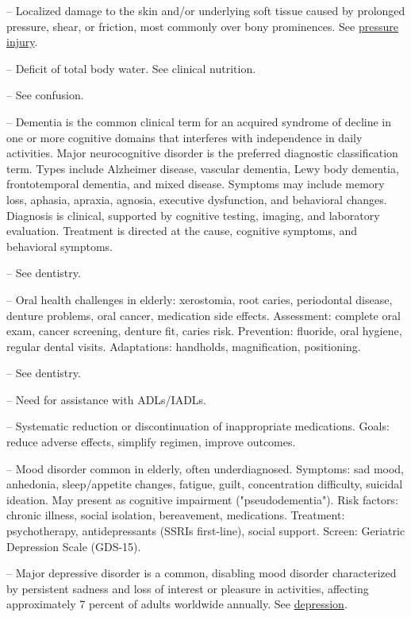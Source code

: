 -- Localized damage to the skin and/or underlying soft tissue caused by prolonged pressure, shear, or friction, most commonly over bony prominences. See \hyperlink{Pressure Injury}{pressure injury}.

-- Deficit of total body water. See clinical nutrition.

-- See confusion.

-- Dementia is the common clinical term for an acquired syndrome of decline in one or more cognitive domains that interferes with independence in daily activities. Major neurocognitive disorder is the preferred diagnostic classification term. Types include Alzheimer disease, vascular dementia, Lewy body dementia, frontotemporal dementia, and mixed disease. Symptoms may include memory loss, aphasia, apraxia, agnosia, executive dysfunction, and behavioral changes. Diagnosis is clinical, supported by cognitive testing, imaging, and laboratory evaluation. Treatment is directed at the cause, cognitive symptoms, and behavioral symptoms.

-- See dentistry.

-- Oral health challenges in elderly: xerostomia, root caries, periodontal disease, denture problems, oral cancer, medication side effects. Assessment: complete oral exam, cancer screening, denture fit, caries risk. Prevention: fluoride, oral hygiene, regular dental visits. Adaptations: handholds, magnification, positioning.

-- See dentistry.

-- Need for assistance with ADLs/IADLs.

-- Systematic reduction or discontinuation of inappropriate medications. Goals: reduce adverse effects, simplify regimen, improve outcomes.

-- Mood disorder common in elderly, often underdiagnosed. Symptoms: sad mood, anhedonia, sleep/appetite changes, fatigue, guilt, concentration difficulty, suicidal ideation. May present as cognitive impairment ("pseudodementia"). Risk factors: chronic illness, social isolation, bereavement, medications. Treatment: psychotherapy, antidepressants (SSRIs first-line), social support. Screen: Geriatric Depression Scale (GDS-15).

-- Major depressive disorder is a common, disabling mood disorder characterized by persistent sadness and loss of interest or pleasure in activities, affecting approximately 7 percent of adults worldwide annually. See \hyperlink{Depression}{depression}.

